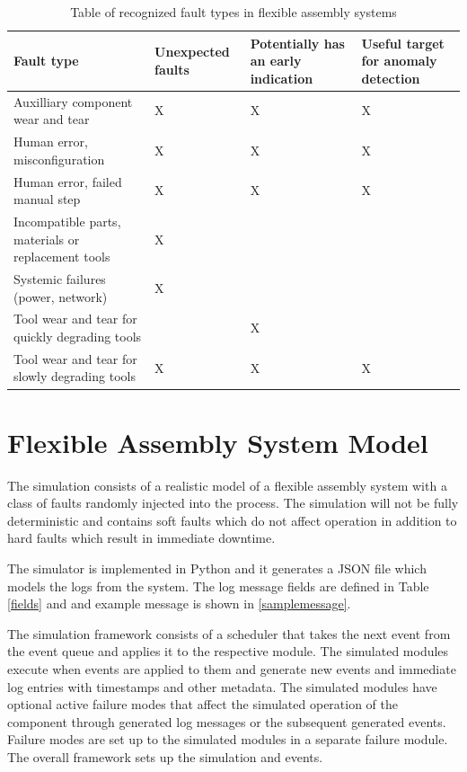 \documentclass[journal]{IEEEtran}
\begin{document}
\begin{table}[!t]
\renewcommand{\arraystretch}{1.3}
\caption{Table of recognized fault types in flexible assembly systems}
\label{faults}
\centering
\begin{tabular}{|p{25mm}|p{15mm}|p{15mm}|p{15mm}|}
\hline
Fault type & Unexpected faults & Potentially has an early indication & Useful target for anomaly detection \\
\hline
\hline
Auxilliary component wear and tear & X & X & X \\
\hline
Human error, misconfiguration & X & X & X \\
\hline
Human error, failed manual step & X & X & X \\
\hline
Incompatible parts, materials or replacement tools & X & & \\
\hline
Systemic failures (power, network) & X & & \\
\hline
Tool wear and tear for quickly degrading tools & & X & \\
\hline
Tool wear and tear for slowly degrading tools & X & X & X \\
\hline
\end{tabular}
\end{table}

\section{Flexible Assembly System Model}

The simulation consists of a realistic model of a flexible assembly system with a class of faults randomly injected into the process.
The simulation will not be fully deterministic and contains soft faults which do not affect operation in addition to hard faults which result in immediate downtime.

The simulator is implemented in Python and it generates a JSON file which models the logs from the system. The log message fields are defined in Table \ref{fields} and
and example message is shown in \ref{samplemessage}.

The simulation framework consists of a scheduler that takes the next event from the event queue and applies it to the respective module. The simulated modules
execute when events are applied to them and generate new events and immediate log entries with timestamps and other metadata.
The simulated modules have optional active failure modes that affect the simulated operation of the component through
generated log messages or the subsequent generated events. Failure modes are set up to the simulated modules in a separate failure module.
The overall framework sets up the simulation and events.
\end{document}
